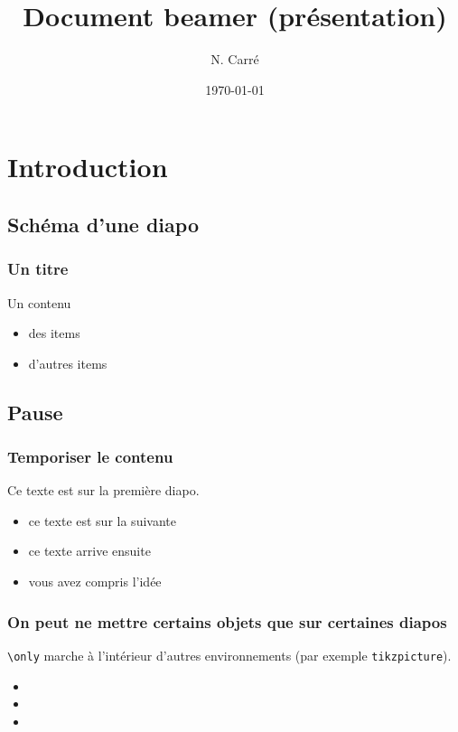 \documentclass[12pt]{beamer}
\title{Document beamer (présentation)}
\author{N. Carré}
\institute{Louis-le-Grand – MPI}
\date{\today}
\begin{document}

\frame{\titlepage} %

\begin{frame}
\tableofcontents %
\end{frame}

\section{Introduction}
\subsection{Schéma d'une diapo}
\begin{frame}
\frametitle{Un titre}
Un contenu

\begin{itemize}
\item des items
\item d'autres items
\end{itemize}
\end{frame}

\subsection{Pause}

\begin{frame}
\frametitle{Temporiser le contenu}
Ce texte est sur la première diapo.\pause
\begin{itemize}
\item ce texte est sur la suivante \pause
\item ce texte arrive ensuite \pause
\item vous avez compris l'idée
\end{itemize}
\end{frame}

\begin{frame}
\frametitle{On peut ne mettre certains objets que sur certaines diapos}
\texttt{\textbackslash only} marche à l'intérieur d'autres environnements  (par exemple \texttt{tikzpicture}).
\begin{itemize}
\item {}
\item {}
\item {}
\end{itemize}

\end{frame}
\end{document}
